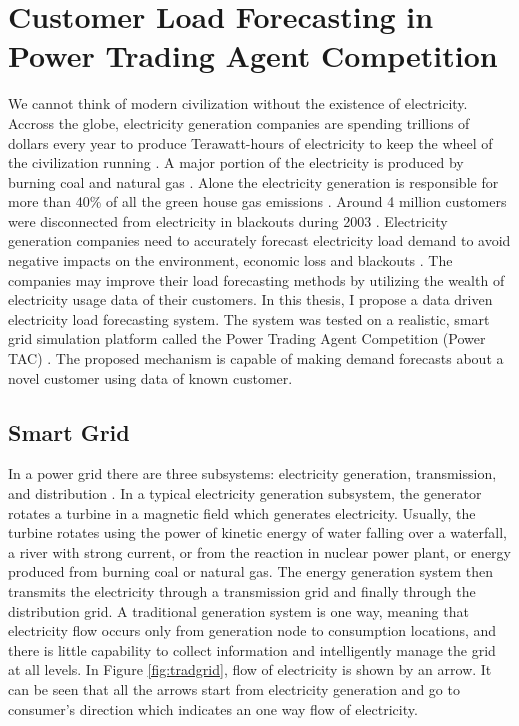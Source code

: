 
\chapter{Customer Load Forecasting in Power Trading Agent Competition}

We cannot think of modern civilization without the existence of electricity. Accross the globe, electricity generation companies are spending trillions of dollars every year to produce Terawatt-hours of electricity to keep the wheel of the civilization running \cite{electricityStats}. A major portion of the electricity is produced by burning coal and natural gas \cite{electricityStats}. Alone the electricity generation is responsible for more than 40\% of all the green house gas emissions \cite{schreiber2009environmental}. Around 4 million customers were disconnected from electricity in blackouts during 2003 \cite{andersson2005causes}. Electricity generation companies need to accurately forecast electricity load demand to avoid negative impacts on the environment, economic loss and blackouts \cite{lodhi2013impact, sanghvi1982economic}. The companies may improve their load forecasting methods by utilizing the wealth of electricity usage data of their customers. In this thesis, I propose a data driven electricity load forecasting system. The system was tested on a realistic, smart grid \cite{fang2012smart} simulation platform called the Power Trading Agent Competition (Power TAC) \cite{ketter2013power}. The proposed mechanism is capable of making demand forecasts about a novel customer using data of known customer.

\section{Smart Grid}

In a power grid there are three subsystems: electricity generation, transmission, and distribution \cite{fang2012smart}. In a typical electricity generation subsystem, the generator rotates a turbine in a magnetic field which generates electricity. Usually, the turbine rotates using the power of kinetic energy of water falling over a waterfall, a river with strong current, or from the reaction in nuclear power plant, or energy produced from burning coal or natural gas. The energy generation system then transmits the electricity through a transmission grid and finally through the distribution grid. A traditional generation system is one way, meaning that electricity flow occurs only from generation node to consumption locations, and there is little capability to collect information and intelligently manage the grid at all levels. In Figure \ref{fig:tradgrid}, flow of electricity is shown by an arrow. It can be seen that all the arrows start from electricity generation and go to consumer's direction which indicates an one way flow of electricity.

